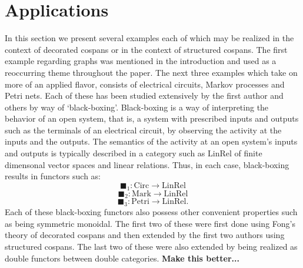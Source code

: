 \documentclass{amsart}
\begin{document}
\section{Applications}
In this section we present several examples each of which may be realized in the context of decorated cospans or in the context of structured cospans. The first example regarding graphs was mentioned in the introduction and used as a reoccurring theme throughout the paper. The next three examples which take on more of an applied flavor, consists of electrical circuits, Markov processes and Petri nets. Each of these has been studied extensively by the first author and others by way of `black-boxing'. Black-boxing is a way of interpreting the behavior of an open system, that is, a system with prescribed inputs and outputs such as the terminals of an electrical circuit, by observing the activity at the inputs and the outputs. The semantics of the activity at an open system's inputs and outputs is typically described in a category such as $\mathrm{LinRel}$ of finite dimensonal vector spaces and linear relations. Thus, in each case, black-boxing results in functors such as: $$\blacksquare_1 \colon \mathrm{Circ} \to \mathrm{LinRel}$$ $$\blacksquare_2 \colon \mathrm{Mark} \to \mathrm{LinRel}$$ $$\blacksquare_3 \colon \mathrm{Petri} \to \mathrm{LinRel}.$$ Each of these black-boxing functors also possess other convenient properties such as being symmetric monoidal. The first two of these were first done using Fong's theory of decorated cospans and then extended by the first two authors using structured cospans. The last two of these were also extended by being realized as double functors between double categories. \textbf{Make this better...}
\end{document}
